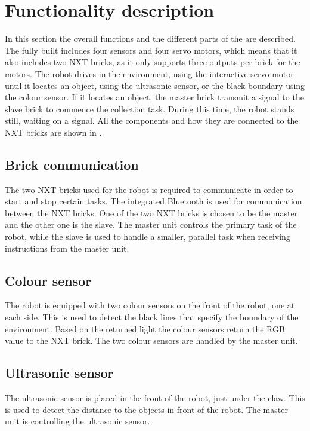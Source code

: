 \section{Functionality description} \label{sec:functionality_description}
In this section the overall functions and the different parts of the \projname{} are described. The fully built \projname{} includes four sensors and four servo motors, which means that it also includes two NXT bricks, as it only supports three outputs per brick for the motors. The robot drives in the environment, using the interactive servo motor until it locates an object, using the ultrasonic sensor, or the black boundary using the colour sensor. If it locates an object, the master brick transmit a signal to the slave brick to commence the collection task. During this time, the robot stands still, waiting on a signal. All the components and how they are connected to the NXT bricks are shown in . 

\subsection{Brick communication}
The two NXT bricks used for the robot is required to communicate in order to start and stop certain tasks. The integrated Bluetooth is used for communication between the NXT bricks. One of the two NXT bricks is chosen to be the master and the other one is the slave. The master unit controls the primary task of the robot, while the slave is used to handle a smaller, parallel task when receiving instructions from the master unit. 

\subsection{Colour sensor} 
The robot is equipped with two colour sensors on the front of the robot, one at each side. This is used to detect the black lines that specify the boundary of the environment. Based on the returned light the colour sensors return the RGB value to the NXT brick. The two colour sensors are handled by the master unit. 

\subsection{Ultrasonic sensor}
The ultrasonic sensor is placed in the front of the robot, just under the claw. This is used to detect the distance to the objects in front of the robot. The master unit is controlling the ultrasonic sensor.

